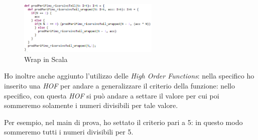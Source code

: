 \begin{figure}[h]
	\centering
	\includegraphics[width=0.6\textwidth]{Immagini/scalaWrap.png}
	\caption{Wrap in Scala}
	\label{fig:scalaWrap}
\end{figure}

Ho inoltre anche aggiunto l'utilizzo delle \textit{High Order Functions}: nella specifico ho inserito una \textit{HOF} per andare a generalizzare il criterio della funzione: nello specifico, con questa \textit{HOF} si può andare a settare il valore per cui poi sommeremo solamente i numeri divisibili per tale valore.

Per esempio, nel main di prova, ho settato il criterio pari a 5: in questo modo sommeremo tutti i numeri divisibili per 5.
